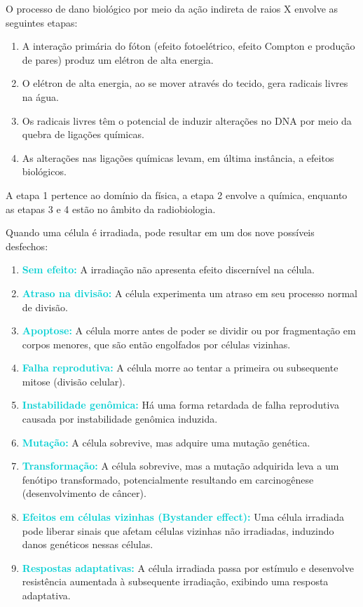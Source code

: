 \documentclass[11pt,a4paper]{article}
\begin{document}
	O processo de dano biológico por meio da ação indireta de raios X envolve as seguintes etapas:

	\begin{enumerate}
	\item A interação primária do fóton (efeito fotoelétrico, efeito Compton e produção de pares) produz um elétron de alta energia.
	\item O elétron de alta energia, ao se mover através do tecido, gera radicais livres na água.
	\item Os radicais livres têm o potencial de induzir alterações no DNA por meio da quebra de ligações químicas.
	\item As alterações nas ligações químicas levam, em última instância, a efeitos biológicos.
	\end{enumerate}

	A etapa 1 pertence ao domínio da física, a etapa 2 envolve a química, enquanto as etapas 3 e 4 estão no âmbito da radiobiologia.

	Quando uma célula é irradiada, pode resultar em um dos nove possíveis desfechos:

	\begin{enumerate}
		\item \textcolor{DarkTurquoise}{\textbf{Sem efeito:}} A irradiação não apresenta efeito discernível na célula.
		\item \textcolor{DarkTurquoise}{\textbf{Atraso na divisão:}} A célula experimenta um atraso em seu processo normal de divisão.
		\item \textcolor{DarkTurquoise}{\textbf{Apoptose:}} A célula morre antes de poder se dividir ou por fragmentação em corpos menores, que são então engolfados por células vizinhas.
		\item \textcolor{DarkTurquoise}{\textbf{Falha reprodutiva:}} A célula morre ao tentar a primeira ou subsequente mitose (divisão celular).
		\item \textcolor{DarkTurquoise}{\textbf{Instabilidade genômica:}} Há uma forma retardada de falha reprodutiva causada por instabilidade genômica induzida.
		\item \textcolor{DarkTurquoise}{\textbf{Mutação:}} A célula sobrevive, mas adquire uma mutação genética.
		\item \textcolor{DarkTurquoise}{\textbf{Transformação:}} A célula sobrevive, mas a mutação adquirida leva a um fenótipo transformado, potencialmente resultando em carcinogênese (desenvolvimento de câncer).
		\item \textcolor{DarkTurquoise}{\textbf{Efeitos em células vizinhas (Bystander effect):}} Uma célula irradiada pode liberar sinais que afetam células vizinhas não irradiadas, induzindo danos genéticos nessas células.
		\item \textcolor{DarkTurquoise}{\textbf{Respostas adaptativas:}} A célula irradiada passa por estímulo e desenvolve resistência aumentada à subsequente irradiação, exibindo uma resposta adaptativa.
	\end{enumerate}
\end{document}
